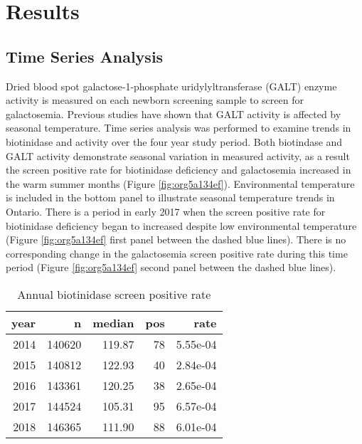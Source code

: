 \documentclass[review]{elsarticle}
\begin{document}
\section*{Results}
\label{sec:org2bab21f}
\subsection*{Time Series Analysis}
\label{sec:org82b87f7}
Dried blood spot galactose-1-phosphate uridylyltransferase (GALT)
enzyme activity is measured on each newborn screening sample to screen
for galactosemia. Previous studies have shown that GALT activity is
affected by seasonal temperature. Time series analysis was performed
to examine trends in biotinidase and activity over the four year study
period. Both biotindase and GALT activity demonstrate seasonal
variation in measured activity, as a result the screen positive rate
for biotinidase deficiency and galactosemia increased in the warm
summer months (Figure \ref{fig:org5a134ef}). Environmental temperature is
included in the bottom panel to illustrate seasonal temperature trends
in Ontario. There is a period in early 2017 when the screen positive
rate for biotinidase deficiency began to increased despite low
environmental temperature (Figure \ref{fig:org5a134ef} first panel between the
dashed blue lines). There is no corresponding change in the
galactosemia screen positive rate during this time period (Figure
\ref{fig:org5a134ef} second panel between the dashed blue lines).

\begin{table}[ht]
\centering
\begin{tabular}{rrrrr}
  \hline
year & n & median & pos & rate \\ 
  \hline
2014 & 140620 & 119.87 &  78 & 5.55e-04 \\ 
  2015 & 140812 & 122.93 &  40 & 2.84e-04 \\ 
  2016 & 143361 & 120.25 &  38 & 2.65e-04 \\ 
  2017 & 144524 & 105.31 &  95 & 6.57e-04 \\ 
  2018 & 146365 & 111.90 &  88 & 6.01e-04 \\ 
   \hline
\end{tabular}
\caption{Annual biotinidase screen positive rate} 
\label{tab:biot_year}
\end{table}
\end{document}
